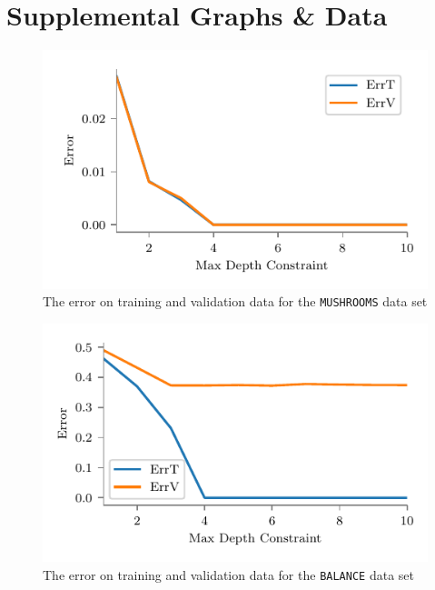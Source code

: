 \documentclass[screen, authorversion, nonacm, sigconf]{acmart}
\begin{document}



\appendix

\section{Supplemental Graphs \& Data}

\begin{figure}[H]
  \centering
  \includegraphics[width=\columnwidth]{figures/chart_errt_errv_mushrooms_ours.pdf}
  \caption{The error on training and validation data for the \texttt{MUSHROOMS} data set}
  \label{fig:mushroomserrterrv}
\end{figure}

\begin{figure}[H]
  \centering
  \includegraphics[width=\columnwidth]{figures/chart_errt_errv_balance_ours.pdf}
  \caption{The error on training and validation data for the \texttt{BALANCE} data set}
  \label{fig:balanceerrterrv}
\end{figure}
\end{document}
